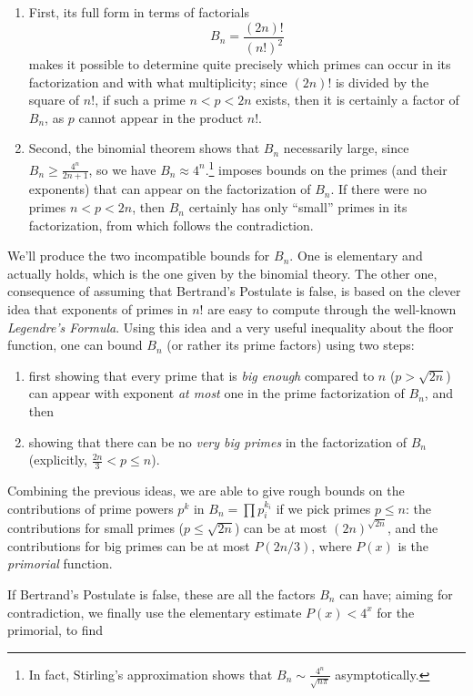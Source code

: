 \documentclass[11pt]{article}
\theoremstyle{remark}
\newcommand{\vs}{\vspace{10px}}
\begin{document}
\begin{enumerate}
    \item First, its full form in terms of factorials
\[
B_n=\frac{(2n)!}{(n!)^2}
\]
makes it possible to determine quite precisely which primes can occur in
its factorization and with what multiplicity; since $(2n)!$ is divided by the square of $n!$, if such a prime $n < p < 2n$ exists, then it is certainly a factor of $B_n$, as $p$ cannot appear in the product $n!$. 

\item Second, the binomial theorem shows that
$B_n$ necessarily large, since $B_n\geq \frac{4^n}{2n+1}$, so we have $B_n\approx 4^n$.\footnote{In fact, Stirling's approximation shows that $B_n \sim \frac{4^n}{\sqrt{n\pi}}$ asymptotically.} imposes bounds on the primes (and their exponents) that can appear on the factorization of $B_n$. If there were no primes $n <p<2n$, then $B_n$ certainly has only ``small'' primes in its factorization, from which follows the contradiction.
\end{enumerate}


We'll produce the two incompatible bounds for $B_n$. One is elementary and actually holds, which is the one given by the binomial theory. The other one, consequence of assuming that Bertrand's Postulate is false, is based on the clever idea that exponents of primes in $n!$ are easy to compute through the well-known \textit{Legendre's Formula}. Using this idea and a very useful inequality about the floor function, one can bound $B_n$ (or rather its prime factors) using two steps:
\begin{enumerate}
    \item first showing that every prime that is \textit{ big enough} compared to $n$ ($p >\sqrt{2n}$) can appear with exponent \textit{at most} one in the prime factorization of $B_n$, and then
    \item showing that there can be no \textit{very big primes} in the factorization of $B_n$ (explicitly, $\frac{2n}3<p\le n$).
\end{enumerate}

Combining the previous ideas, we are able to give rough bounds on the contributions of prime powers $p^k$ in $B_n=\prod p_i^{k_i}$ if we pick primes $p \le n$: the contributions for small primes ($p\le \sqrt{2n}$) can be at most $(2n)^{\sqrt{2n}}$, and the contributions for big primes can be at most $P(2n/3)$, where $P(x)$ is the \textit{primorial} function. 
\vs

If Bertrand's Postulate is false, these are all the factors $B_n$ can have; aiming for contradiction, we finally use the elementary estimate $P(x)< 4^x$ for the primorial, to find
\end{document}
